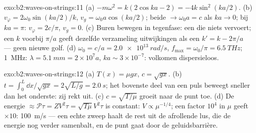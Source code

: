 \begin{solution}{exo:b2:waves-on-strings:11}
(a) $-m\omega^2 = k(2\cos ka - 2) = -4k\sin^2(ka/2)$. (b)
$v_\varphi = 2\omega_0\sin(ka/2)
/k$, $v_g = \omega_0a\cos(ka/2)$; beide
$\to \omega_0a = c$ als $ka \to 0$; bij $ka = \pi$: $v_\varphi = 2c/\pi$,
$v_g = 0$. (c) Buren bewegen in tegenfase: een  die niets
vervoert; een $k$ voorbij $\pi/a$ geeft dezelfde verzameling uitwijkingen
als een $k' = k - 2\pi/a$ --- geen nieuwe golf. (d)
$\omega_0 = c/a =
\qty{2.0e13}{rad/s}$,
$f_{\max} = \omega_0/\pi = \qty{6.5}{THz}$; \qty{1}{MHz}:
$\lambda =
\qty{5.1}{mm} = 2 \times 10^7a$, $ka \sim 3 \times 10^{-7}$:
volkomen dispersieloos.
\end{solution}

\begin{solution}{exo:b2:waves-on-strings:12}
(a) $T(x) = \mu gx$, $c = \sqrt{gx}$. (b)
$t = \int_0^L\dd x/\sqrt{gx} = 2\sqrt{L/g} =
\qty{2.0}{s}$; het bovenste
deel van een puls beweegt sneller dan het onderste: zij rekt uit. (c)
$c = \sqrt{T/\mu}$ groeit naar de punt toe. (d) De energie
$\approx
\mathcal P\tau = ZV^2\tau = \sqrt{T\mu}V^2\tau$ is constant:
$V \propto \mu^{-1/4}$; een factor $10^4$ in $\mu$ geeft $\times10$:
\qty{100}{m/s} --- een echte zweep haalt de rest uit de afrollende lus, die
de energie nog verder samenbalt, en de punt gaat door de geluidsbarrière.
\end{solution}

